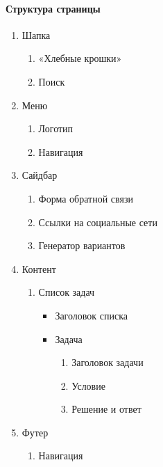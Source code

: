 \paragraph{Структура страницы}
\begin{enumerate}
	\item Шапка
	\begin{enumerate}
		\item «Хлебные крошки»
		\item Поиск
	\end{enumerate}

	\item Меню
	\begin{enumerate}
		\item Логотип
		\item Навигация
	\end{enumerate}

	\item Сайдбар
	\begin{enumerate}
		\item Форма обратной связи
		\item Ссылки на социальные сети
		\item Генератор вариантов
	\end{enumerate}

	\item Контент
	\begin{enumerate}
		\item Список задач
		\begin{itemize}
			\item Заголовок списка
			\item Задача
			\begin{enumerate}
				\item Заголовок задачи
				\item Условие
				\item Решение и ответ
			\end{enumerate}
		\end{itemize}
	\end{enumerate}

	\item Футер
	\begin{enumerate}
		\item Навигация
	\end{enumerate}
\end{enumerate}

